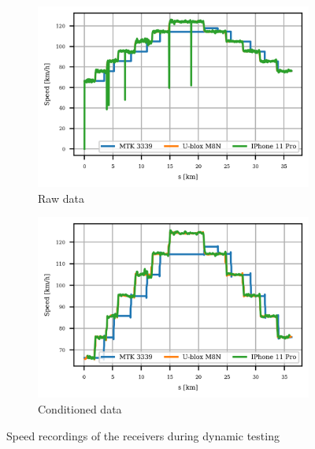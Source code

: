 \documentclass{article}
\begin{document}
			\begin{figure}[h]
		   		\centering
		     	\begin{subfigure}[b]{0.45\textwidth}
		      		\centering
		      	  	\includegraphics[width=\textwidth]{Dynamic/raw_speed.png}
		      	  	\caption{Raw data}
		     	\end{subfigure}
		     	\begin{subfigure}[b]{0.45\textwidth}
		      	   \centering
		      	   \includegraphics[width=\textwidth]{Dynamic/cond_speed.png}
		      	   \caption{Conditioned data}
		     	\end{subfigure}
		     	
		      \caption{Speed recordings of the receivers during dynamic testing}
		      \label{fig:dynamic_speed}
			\end{figure}		
\end{document}
